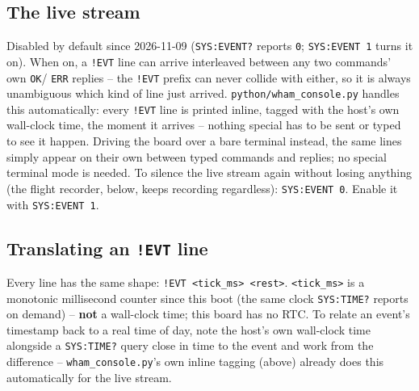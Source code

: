 \documentclass[11pt]{article}
\newcommand{\code}[1]{\texttt{#1}}
\begin{document}
\subsection{The live stream}

Disabled by default since 2026-11-09 (\code{SYS:EVENT?} reports \code{0}; \code{SYS:EVENT 1} turns it on). When on, a \code{!EVT}
line can arrive interleaved between any two commands' own \code{OK}/
\code{ERR} replies -- the \code{!EVT} prefix can never collide with
either, so it is always unambiguous which kind of line just arrived.
\code{python/wham\_console.py} handles this automatically: every
\code{!EVT} line is printed inline, tagged with the host's own
wall-clock time, the moment it arrives -- nothing special has to be
sent or typed to see it happen. Driving the board over a bare terminal
instead, the same lines simply appear on their own between typed
commands and replies; no special terminal mode is needed. To silence
the live stream again without losing anything (the flight recorder, below,
keeps recording regardless): \code{SYS:EVENT 0}. Enable it with
\code{SYS:EVENT 1}.

\subsection{Translating an \code{!EVT} line}

Every line has the same shape: \code{!EVT <tick\_ms> <rest>}.
\code{<tick\_ms>} is a monotonic millisecond counter since this boot
(the same clock \code{SYS:TIME?} reports on demand) -- \textbf{not} a
wall-clock time; this board has no RTC. To relate an event's timestamp
back to a real time of day, note the host's own wall-clock time
alongside a \code{SYS:TIME?} query close in time to the event and work
from the difference -- \code{wham\_console.py}'s own inline tagging
(above) already does this automatically for the live stream.
\end{document}
